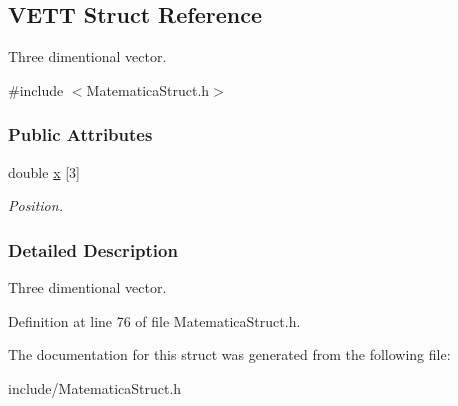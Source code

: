 \hypertarget{structVETT}{}\subsection{V\+E\+TT Struct Reference}
\label{structVETT}


Three dimentional vector.  




{\ttfamily \#include $<$Matematica\+Struct.\+h$>$}

\subsubsection*{Public Attributes}
\begin{DoxyCompactItemize}
\item 
double \hyperlink{structVETT_a8639a6dd4fb3c4aa452b708733d827b4}{x} \mbox{[}3\mbox{]}\hypertarget{structVETT_a8639a6dd4fb3c4aa452b708733d827b4}{}\label{structVETT_a8639a6dd4fb3c4aa452b708733d827b4}

\begin{DoxyCompactList}\small\item\em Position. \end{DoxyCompactList}\end{DoxyCompactItemize}


\subsubsection{Detailed Description}
Three dimentional vector. 

Definition at line 76 of file Matematica\+Struct.\+h.



The documentation for this struct was generated from the following file\+:\begin{DoxyCompactItemize}
\item 
include/Matematica\+Struct.\+h\end{DoxyCompactItemize}
